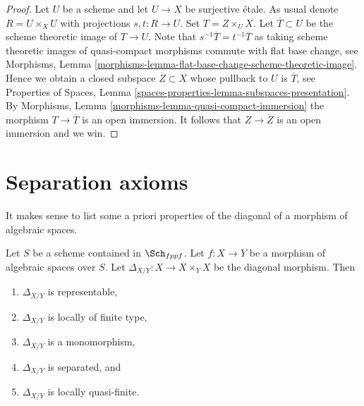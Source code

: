 \begin{proof}
Let $U$ be a scheme and let $U \to X$ be surjective \'etale.
As usual denote $R = U \times_X U$ with projections
$s, t : R \to U$. Set $T = Z \times_U X$. Let $\overline{T} \subset U$
be the scheme theoretic image of $T \to U$. Note that
$s^{-1}\overline{T} = t^{-1}\overline{T}$ as taking
scheme theoretic images of quasi-compact morphisms commute
with flat base change, see
Morphisms, Lemma \ref{morphisms-lemma-flat-base-change-scheme-theoretic-image}.
Hence we obtain a closed subspace $\overline{Z} \subset X$ whose
pullback to $U$ is $\overline{T}$, see
Properties of Spaces, Lemma
\ref{spaces-properties-lemma-subspaces-presentation}.
By Morphisms, Lemma \ref{morphisms-lemma-quasi-compact-immersion}
the morphism $T \to \overline{T}$
is an open immersion. It follows that $Z \to \overline{Z}$ is
an open immersion and we win.
\end{proof}















\section{Separation axioms}
\label{section-separation-axioms}

\noindent
It makes sense to list some a priori properties of the diagonal of
a morphism of algebraic spaces.

\begin{lemma}
\label{lemma-properties-diagonal}
Let $S$ be a scheme contained in $\Sch_{fppf}$.
Let $f : X \to Y$ be a morphism of algebraic spaces over $S$.
Let $\Delta_{X/Y} : X \to X \times_Y X$ be the diagonal morphism.
Then
\begin{enumerate}
\item $\Delta_{X/Y}$ is representable,
\item $\Delta_{X/Y}$ is locally of finite type,
\item $\Delta_{X/Y}$ is a monomorphism,
\item $\Delta_{X/Y}$ is separated, and
\item $\Delta_{X/Y}$ is locally quasi-finite.
\end{enumerate}
\end{lemma}

